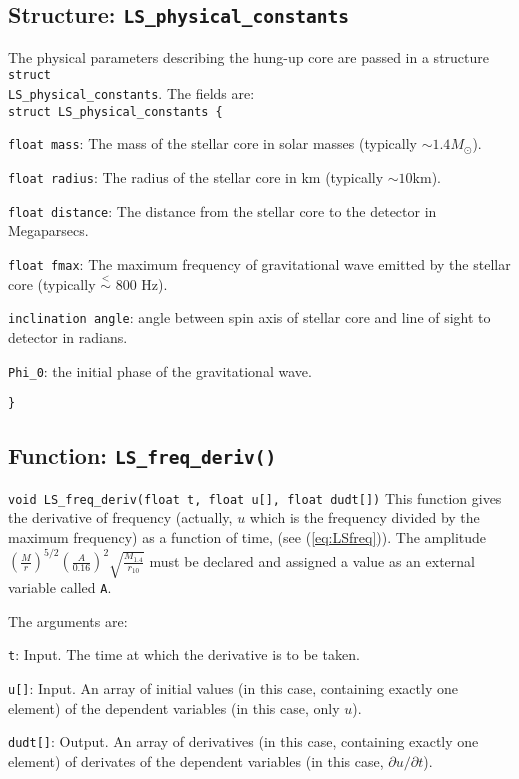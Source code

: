 \subsection{Structure: {\tt LS\_physical\_constants}} \label{ss:LSstruct}
The physical parameters describing the hung-up core are passed in a
structure {\tt struct}\\ {\tt LS\_physical\_constants}. The fields are:\\
{\tt struct LS\_physical\_constants \{}
\begin{description}
\item{\tt float mass}: The mass of the stellar core in solar masses (typically
$\sim 1.4 M_\odot$).
\item{\tt float radius}: The radius of the stellar core in km (typically $\sim
10$km).
\item{\tt float distance}: The distance from the stellar core to the detector 
in Megaparsecs.
\item{\tt float fmax}: The maximum frequency of gravitational wave emitted by
the stellar core (typically $\stackrel{<}{\sim}$ 800 Hz).
\item{\tt inclination angle}: angle between spin axis of stellar core and line
of sight to detector in radians.
\item{\tt Phi\_0}: the initial phase of the gravitational wave. 
\end{description}
{\tt \}}
\newpage

\subsection{Function: {\tt LS\_freq\_deriv()}}
\label{ss:Lfd}
{\tt void LS\_freq\_deriv(float t, float u[], float dudt[])}
This function gives the derivative of frequency (actually, $u$ which
is the frequency divided by the maximum frequency) as a function of 
time, (see (\ref{eq:LSfreq})). The amplitude $\left(\frac{M}{r}\right)^{5/2} 
\left(\frac{A}{0.16}\right)^2 \sqrt{\frac{M_{1.4}}{r_{10}}}$ must be declared
and assigned a value as an external variable called {\tt A}.

The arguments are:
\begin{description}
\item{\tt t}: Input. The time at which the derivative is to be taken.
\item{\tt u[]}: Input. An array of initial values (in this case, containing
exactly one element) of the dependent variables (in this case, only $u$).
\item{\tt dudt[]}: Output. An array of derivatives (in this case, containing
exactly one element) of derivates of the dependent variables (in this case,
$\partial u /\partial t$).
\end{description}

